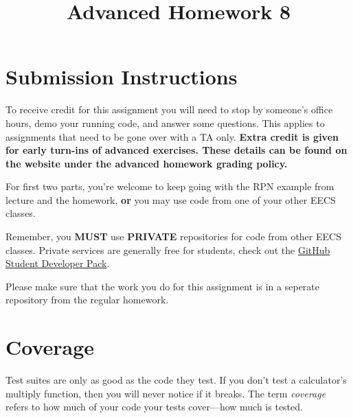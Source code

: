 \documentclass{article}
\begin{document}
\fancyfoot[C]{\color{gray} \thepage~/~\pageref*{LastPage}}
\pagestyle{fancyplain}

\title{\textbf{Advanced Homework 8\\}}
\author{\textbf{\color{red}{Due: Wednesday, November 7th, 11:59PM (Hard Deadline)}}}
\date{}
\maketitle


\section*{Submission Instructions}
To receive credit for this assignment you will need to stop by someone's
office hours, demo your running code, and answer some questions. \textbf{\color{red}{Make sure
to check the office hour schedule as the real due date is at the last office
hours before the date listed above.}} This applies to assignments that need to be gone over with a TA only.
\textbf{Extra credit is given for early turn-ins of advanced exercises. These details can be found on the website under the advanced homework grading policy.}


\begin{mdframed}[innerleftmargin=38pt,innerrightmargin=38pt]\justify
  For first two parts, you're welcome to keep going with the RPN example from
  lecture and the homework, \textbf{or} you may use code from one of your
  other EECS classes.

  {\color{red}Remember, you \textbf{MUST} use \textbf{PRIVATE} repositories
    for code from other EECS classes.} Private services are generally free for
  students, check out the \href{https://education.github.com/pack}{GitHub Student Developer Pack}.
  
  Please make sure that the work you do for this assignment is in a seperate repository from the regular homework.
\end{mdframed}

\section{Coverage}

Test suites are only as good as the code they test. If you don't test a
calculator's multiply function, then you will never notice if it breaks. The
term \emph{coverage} refers to how much of your code your tests cover---how
much is tested.
\end{document}

